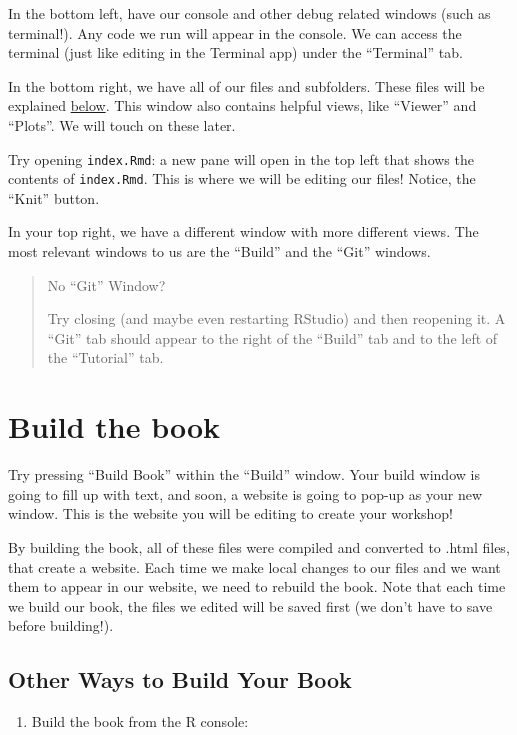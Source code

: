 \documentclass[
]{book}
\providecommand{\tightlist}{%
  \setlength{\itemsep}{0pt}\setlength{\parskip}{0pt}}
\theoremstyle{definition}
\theoremstyle{definition}
\theoremstyle{definition}
\theoremstyle{definition}
\theoremstyle{remark}
\begin{document}
In the bottom left, have our console and other debug related windows (such as terminal!). Any code we run will appear in the console. We can access the terminal (just like editing in the Terminal app) under the ``Terminal'' tab.

In the bottom right, we have all of our files and subfolders. These files will be explained \hyperref[file-setup]{below}. This window also contains helpful views, like ``Viewer'' and ``Plots''. We will touch on these later.

Try opening \texttt{index.Rmd}: a new pane will open in the top left that shows the contents of \texttt{index.Rmd}. This is where we will be editing our files! Notice, the ``Knit'' button.

In your top right, we have a different window with more different views. The most relevant windows to us are the ``Build'' and the ``Git'' windows.

\begin{quote}
No ``Git'' Window?

Try closing (and maybe even restarting RStudio) and then reopening it. A ``Git'' tab should appear to the right of the ``Build'' tab and to the left of the ``Tutorial'' tab.
\end{quote}

\section{Build the book}\label{build-the-book}

Try pressing ``Build Book'' within the ``Build'' window. Your build window is going to fill up with text, and soon, a website is going to pop-up as your new window. This is the website you will be editing to create your workshop!

By building the book, all of these files were compiled and converted to .html files, that create a website. Each time we make local changes to our files and we want them to appear in our website, we need to rebuild the book. Note that each time we build our book, the files we edited will be saved first (we don't have to save before building!).

\subsection{Other Ways to Build Your Book}\label{other-ways-to-build-your-book}

\begin{enumerate}
\def\labelenumi{\arabic{enumi}.}
\tightlist
\item
  Build the book from the R console:
\end{enumerate}
\end{document}
